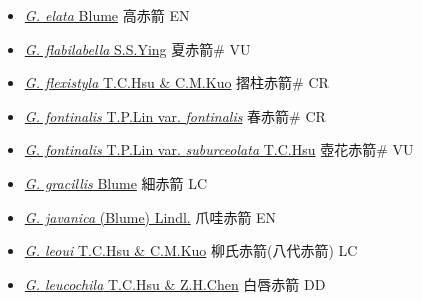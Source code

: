 \begin{itemize}
\begin{itemize}
        \item[] \href{http://www.theplantlist.org/tpl1.1/search?q=Gastrodia+elata}{\textit{G. elata} Blume}   高赤箭 EN
        \item[] \href{http://www.theplantlist.org/tpl1.1/search?q=Gastrodia+flabilabella}{\textit{G. flabilabella} S.S.Ying}     夏赤箭\# VU
        \item[] \href{http://www.theplantlist.org/tpl1.1/search?q=Gastrodia+flexistyla}{\textit{G. flexistyla} T.C.Hsu \& C.M.Kuo}   摺柱赤箭\# CR
        \item[] \href{http://www.theplantlist.org/tpl1.1/search?q=Gastrodia+fontinalis+var.+fontinalis}{\textit{G. fontinalis} T.P.Lin var. \textit{fontinalis}}   春赤箭\# CR
        \item[] \href{http://www.theplantlist.org/tpl1.1/search?q=Gastrodia+fontinalis+var.+suburceolata}{\textit{G. fontinalis} T.P.Lin var. \textit{suburceolata} T.C.Hsu}   壺花赤箭\# VU
        \item[] \href{http://www.theplantlist.org/tpl1.1/search?q=Gastrodia+gracillis}{\textit{G. gracillis} Blume}   細赤箭 LC
        \item[] \href{http://www.theplantlist.org/tpl1.1/search?q=Gastrodia+javanica}{\textit{G. javanica} (Blume) Lindl.}   爪哇赤箭 EN
        \item[] \href{http://www.theplantlist.org/tpl1.1/search?q=Gastrodia+leoui}{\textit{G. leoui} T.C.Hsu \& C.M.Kuo}     柳氏赤箭(八代赤箭)   LC
        \item[] \href{http://www.theplantlist.org/tpl1.1/search?q=Gastrodia+leucochila}{\textit{G. leucochila} T.C.Hsu \& Z.H.Chen}   白唇赤箭 DD

\end{itemize}
\end{itemize}
